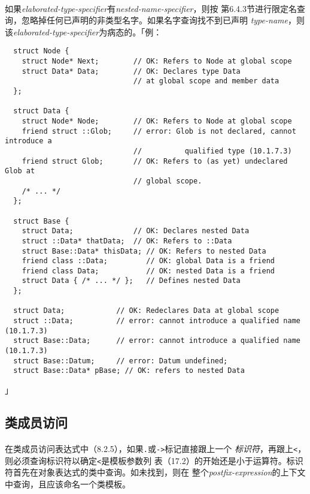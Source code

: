 \paragraph{}
如果\textit{elaborated-type-specifier}有\textit{nested-name-specifier}，则按
第6.4.3节进行限定名查询，忽略掉任何已声明的非类型名字。如果名字查询找不到已声明
\textit{type-name}，则该\textit{elaborated-type-specifier}为病态的。「例：
\begin{lstlisting}
  struct Node {
    struct Node* Next;        // OK: Refers to Node at global scope
    struct Data* Data;        // OK: Declares type Data
                              // at global scope and member data
  };

  struct Data {
    struct Node* Node;        // OK: Refers to Node at global scope
    friend struct ::Glob;     // error: Glob is not declared, cannot introduce a
                              //          qualified type (10.1.7.3)
    friend struct Glob;       // OK: Refers to (as yet) undeclared Glob at
                              // global scope.
    /* ... */
  };

  struct Base {
    struct Data;              // OK: Declares nested Data
    struct ::Data* thatData;  // OK: Refers to ::Data
    struct Base::Data* thisData; // OK: Refers to nested Data
    friend class ::Data;         // OK: global Data is a friend
    friend class Data;           // OK: nested Data is a friend
    struct Data { /* ... */ };   // Defines nested Data
  };

  struct Data;            // OK: Redeclares Data at global scope
  struct ::Data;          // error: cannot introduce a qualified name (10.1.7.3)
  struct Base::Data;      // error: cannot introduce a qualified name (10.1.7.3)
  struct Base::Datum;     // error: Datum undefined;
  struct Base::Data* pBase; // OK: refers to nested Data
\end{lstlisting}」

\subsection{类成员访问}
\paragraph{}
在类成员访问表达式中（8.2.5），如果\texttt{.}或\texttt{->}标记直接跟上一个
\textit{标识符}，再跟上\texttt{<}，则必须查询标识符以确定\texttt{<}是模板参数列
表（17.2）的开始还是小于运算符。标识符首先在对象表达式的类中查询。如未找到，则在
整个\textit{postfix-expression}的上下文中查询，且应该命名一个类模板。

